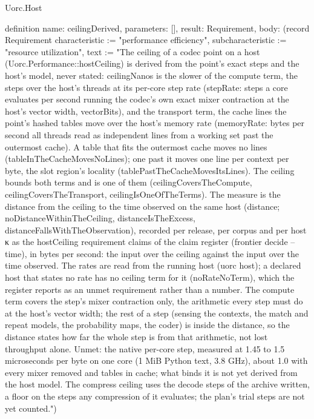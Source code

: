 \begin{lexlean}{Uorc.Host}
\begin{semanticmodule}
definition{
  name: ceilingDerived,
  parameters: [],
  result: Requirement,
  body: (record Requirement {characteristic := "performance efficiency", subcharacteristic := "resource utilization", text := "The ceiling of a codec point on a host (Uorc.Performance::hostCeiling) is derived from the point's exact steps and the host's model, never stated: ceilingNanos is the slower of the compute term, the steps over the host's threads at its per-core step rate (stepRate: steps a core evaluates per second running the codec's own exact mixer contraction at the host's vector width, vectorBits), and the transport term, the cache lines the point's hashed tables move over the host's memory rate (memoryRate: bytes per second all threads read as independent lines from a working set past the outermost cache). A table that fits the outermost cache moves no lines (tableInTheCacheMovesNoLines); one past it moves one line per context per byte, the slot region's locality (tablePastTheCacheMovesItsLines). The ceiling bounds both terms and is one of them (ceilingCoversTheCompute, ceilingCoversTheTransport, ceilingIsOneOfTheTerms). The measure is the distance from the ceiling to the time observed on the same host (distance; noDistanceWithinTheCeiling, distanceIsTheExcess, distanceFallsWithTheObservation), recorded per release, per corpus and per host κ as the hostCeiling requirement claims of the claim register (frontier decide --time), in bytes per second: the input over the ceiling against the input over the time observed. The rates are read from the running host (uorc host); a declared host that states no rate has no ceiling term for it (noRateNoTerm), which the register reports as an unmet requirement rather than a number. The compute term covers the step's mixer contraction only, the arithmetic every step must do at the host's vector width; the rest of a step (sensing the contexts, the match and repeat models, the probability maps, the coder) is inside the distance, so the distance states how far the whole step is from that arithmetic, not lost throughput alone. Unmet: the native per-core step, measured at 1.45 to 1.5 microseconds per byte on one core (1 MiB Python text, 3.8 GHz), about 1.0 with every mixer removed and tables in cache; what binds it is not yet derived from the host model. The compress ceiling uses the decode steps of the archive written, a floor on the steps any compression of it evaluates; the plan's trial steps are not yet counted."})
}
\end{semanticmodule}
\end{lexlean}
